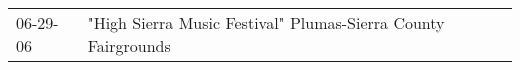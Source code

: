 \begin{supertabular}{p{0.07\textwidth}p{0.23\textwidth}}
 06-29-06 &  "High Sierra Music Festival" Plumas-Sierra County Fairgrounds \\
\end{supertabular}
